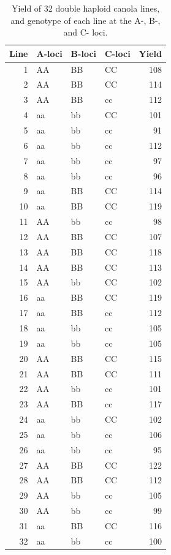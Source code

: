 \documentclass[11pt,dvipsnames,ignorenonframetext,aspectratio=169]{beamer}
\begin{document}
\begin{frame}{}
\protect\hypertarget{section-10}{}
\renewcommand{\arraystretch}{0.8}

\begin{table}

\caption{\label{tab:marker-phenotype-data}Yield of 32 double haploid canola lines, and genotype of each line at the A-, B-, and C- loci.}
\centering
\fontsize{5}{7}\selectfont
\begin{tabular}[t]{rlllr}
\toprule
Line & A-loci & B-loci & C-loci & Yield\\
\midrule
1 & AA & BB & CC & 108\\
2 & AA & BB & CC & 114\\
3 & AA & BB & cc & 112\\
4 & aa & bb & CC & 101\\
5 & aa & bb & cc & 91\\
6 & aa & bb & cc & 112\\
7 & aa & bb & cc & 97\\
8 & aa & bb & cc & 96\\
9 & aa & BB & CC & 114\\
10 & aa & BB & CC & 119\\
11 & AA & bb & cc & 98\\
12 & AA & BB & CC & 107\\
13 & AA & BB & CC & 118\\
14 & AA & BB & CC & 113\\
15 & AA & bb & CC & 102\\
16 & aa & BB & CC & 119\\
17 & aa & BB & cc & 112\\
18 & aa & bb & cc & 105\\
19 & aa & bb & cc & 105\\
20 & AA & BB & CC & 115\\
21 & AA & BB & CC & 111\\
22 & AA & bb & cc & 101\\
23 & AA & BB & cc & 117\\
24 & aa & bb & CC & 102\\
25 & aa & bb & cc & 106\\
26 & aa & bb & cc & 95\\
27 & AA & BB & CC & 122\\
28 & AA & BB & CC & 112\\
29 & AA & bb & cc & 105\\
30 & AA & bb & cc & 99\\
31 & aa & BB & CC & 116\\
32 & aa & bb & cc & 100\\
\bottomrule
\end{tabular}
\end{table}
\end{frame}
\end{document}
